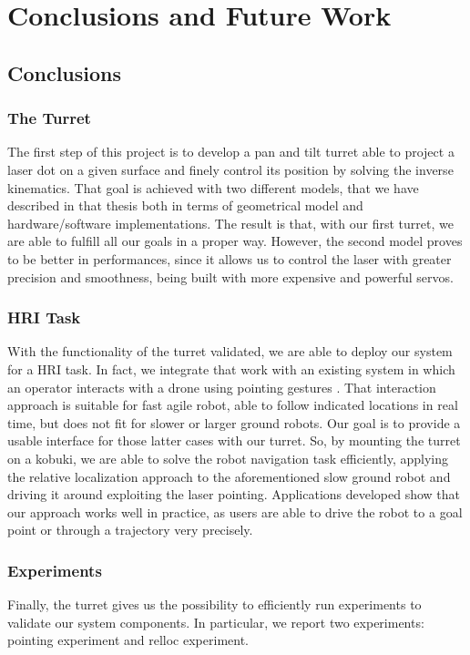 \chapter{Conclusions and Future Work} 
\label{chap:5} 
\section{Conclusions}
\subsection{The Turret}
The first step of this project is to develop a pan and tilt turret able to project a laser dot on a given surface and finely control its position by solving the inverse kinematics. That goal is achieved with two different models, that we have described in that thesis both in terms of geometrical model and hardware/software implementations. The result is that, with our first turret, we are able to fulfill all our goals in a proper way. However, the second model proves to be better in performances, since it allows us to control the laser with greater precision and smoothness, being built with more expensive and powerful servos.

\subsection{HRI Task}
With the functionality of the turret validated, we are able to deploy our system for a \ac{HRI} task. In fact, we integrate that work with an existing system in which an operator interacts with a drone using pointing gestures \cite{gromov2018robot}. That interaction approach is suitable for fast agile robot, able to follow indicated locations in real time, but does not fit for slower or larger ground robots. Our goal is to provide a usable interface for those latter cases with our turret. So, by mounting the turret on a kobuki, we are able to solve the robot navigation task efficiently, applying the relative localization approach to the aforementioned slow ground robot and driving it around exploiting the laser pointing. Applications developed show that our approach works well in practice, as users are able to drive the robot to a goal point or through a trajectory very precisely.

\subsection{Experiments}
Finally, the turret gives us the possibility to efficiently run experiments to validate our system components. In particular, we report two experiments: pointing experiment and \ac{relloc} experiment.

